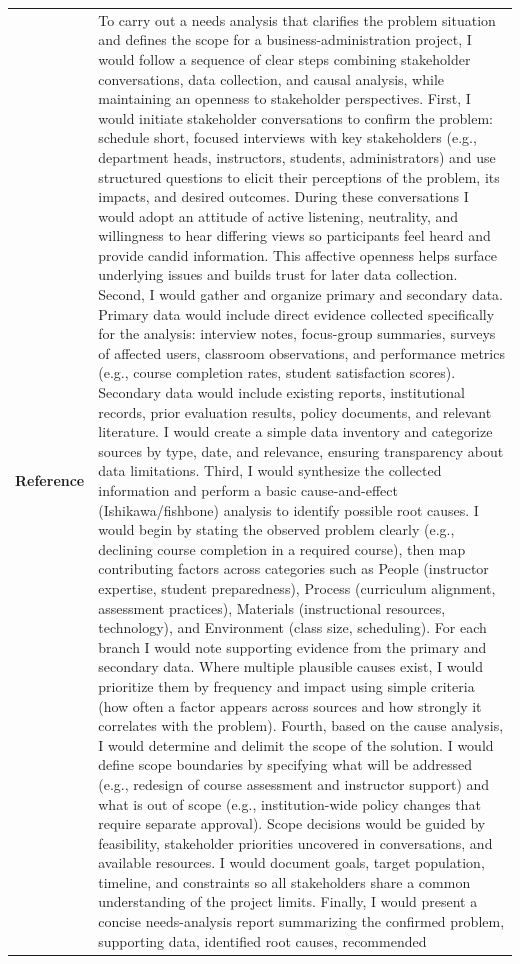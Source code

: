 \begin{longtable}{@{}l p{12.5cm}@{}}
  \textbf{Reference} & To carry out a needs analysis that clarifies the problem situation and defines the scope for a business-administration project, I would follow a sequence of clear steps combining stakeholder conversations, data collection, and causal analysis, while maintaining an openness to stakeholder perspectives. First, I would initiate stakeholder conversations to confirm the problem: schedule short, focused interviews with key stakeholders (e.g., department heads, instructors, students, administrators) and use structured questions to elicit their perceptions of the problem, its impacts, and desired outcomes. During these conversations I would adopt an attitude of active listening, neutrality, and willingness to hear differing views so participants feel heard and provide candid information. This affective openness helps surface underlying issues and builds trust for later data collection. \newline Second, I would gather and organize primary and secondary data. Primary data would include direct evidence collected specifically for the analysis: interview notes, focus-group summaries, surveys of affected users, classroom observations, and performance metrics (e.g., course completion rates, student satisfaction scores). Secondary data would include existing reports, institutional records, prior evaluation results, policy documents, and relevant literature. I would create a simple data inventory and categorize sources by type, date, and relevance, ensuring transparency about data limitations. \newline Third, I would synthesize the collected information and perform a basic cause-and-effect (Ishikawa/fishbone) analysis to identify possible root causes. I would begin by stating the observed problem clearly (e.g., declining course completion in a required course), then map contributing factors across categories such as People (instructor expertise, student preparedness), Process (curriculum alignment, assessment practices), Materials (instructional resources, technology), and Environment (class size, scheduling). For each branch I would note supporting evidence from the primary and secondary data. Where multiple plausible causes exist, I would prioritize them by frequency and impact using simple criteria (how often a factor appears across sources and how strongly it correlates with the problem). \newline Fourth, based on the cause analysis, I would determine and delimit the scope of the solution. I would define scope boundaries by specifying what will be addressed (e.g., redesign of course assessment and instructor support) and what is out of scope (e.g., institution-wide policy changes that require separate approval). Scope decisions would be guided by feasibility, stakeholder priorities uncovered in conversations, and available resources. I would document goals, target population, timeline, and constraints so all stakeholders share a common understanding of the project limits. \newline Finally, I would present a concise needs-analysis report summarizing the confirmed problem, supporting data, identified root causes, recommended 
\end{longtable}
